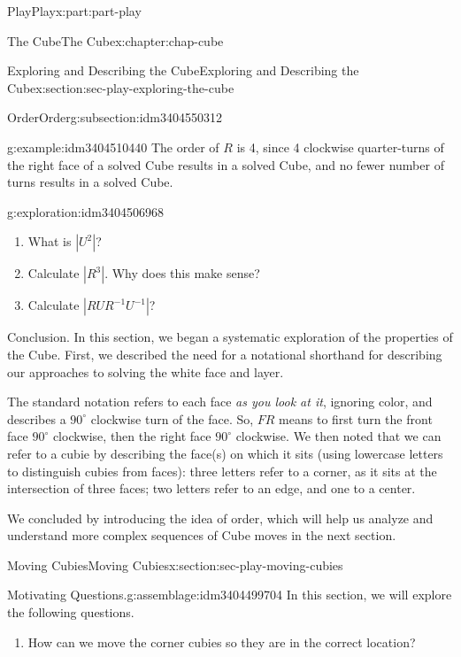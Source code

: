 \documentclass[oneside,10pt,]{book}
\numberwithin{equation}{section}
\begin{document}
\begin{partptx}{Play}{}{Play}{}{}{x:part:part-play}
\begin{chapterptx}{The Cube}{}{The Cube}{}{}{x:chapter:chap-cube}
\begin{sectionptx}{Exploring and Describing the Cube}{}{Exploring and Describing the Cube}{}{}{x:section:sec-play-exploring-the-cube}
\begin{subsectionptx}{Order}{}{Order}{}{}{g:subsection:idm3404550312}
\begin{example}{}{g:example:idm3404510440}%
The order of \(R\) is 4, since 4 clockwise quarter-turns of the right face of a solved Cube results in a solved Cube, and no fewer number of turns results in a solved Cube.%
\end{example}
\begin{exploration}{}{g:exploration:idm3404506968}%
%
\begin{enumerate}
\item{}What is \(|U^2|\)?%
\item{}Calculate \(|R^3|\). Why does this make sense?%
\item{}Calculate \(|RUR^{-1} U^{-1}|\)?%
\end{enumerate}
\end{exploration}%
\end{subsectionptx}
\begin{conclusion}{Conclusion.}%
In this section, we began a systematic exploration of the properties of the Cube. First, we described the need for a notational shorthand for describing our approaches to solving the white face and layer.%
\par
The standard notation refers to each face \emph{as you look at it}, ignoring color, and describes a \(90^\circ\) clockwise turn of the face. So, \(FR\) means to first turn the front face \(90^\circ\) clockwise, then the right face \(90^\circ\) clockwise. We then noted that we can refer to a cubie by describing the face(s) on which it sits (using lowercase letters to distinguish cubies from faces): three letters refer to a corner, as it sits at the intersection of three faces; two letters refer to an edge, and one to a center.%
\par
We concluded by introducing the idea of order, which will help us analyze and understand more complex sequences of Cube moves in the next section.%
\end{conclusion}%
\end{sectionptx}
%
%
\typeout{************************************************}
\typeout{************************************************}
%
\begin{sectionptx}{Moving Cubies}{}{Moving Cubies}{}{}{x:section:sec-play-moving-cubies}
\begin{assemblage}{Motivating Questions.}{g:assemblage:idm3404499704}%
In this section, we will explore the following questions. %
\begin{enumerate}
\item{}How can we move the corner cubies so they are in the correct location?%

\end{enumerate}
\end{assemblage}
\end{sectionptx}
\end{chapterptx}
\end{partptx}
\end{document}
